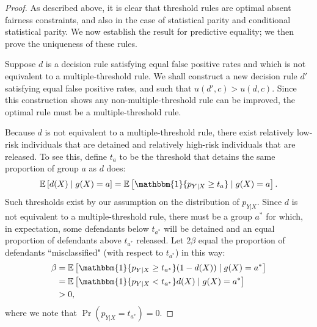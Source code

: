 \documentclass[sigconf]{acmart}
\newcommand{\EE}{\mathbb{E}}
\begin{document}
\begin{proof}

As described above, it is clear that threshold rules are optimal absent fairness constraints, and also in the case of statistical parity and conditional statistical parity.
We now establish the result for predictive equality; we then prove the uniqueness of these rules.

Suppose $d$ is a decision rule satisfying equal false positive rates
and which is not equivalent to a multiple-threshold rule.
We shall construct a new decision rule $d'$
satisfying equal false positive rates, and such that
$u(d',c) > u(d,c)$.
Since this construction shows any non-multiple-threshold rule can be improved, the optimal rule must be a multiple-threshold rule.

Because $d$ is not equivalent to a multiple-threshold rule, there exist relatively low-risk individuals that are detained and relatively high-risk 
individuals that are released.
To see this, define $t_a$ to be the threshold that detains the same proportion of group $a$ as $d$ does:
\begin{equation*}
\EE \left [d(X) \mid g(X)=a\right] = \EE \left [\mathbbm{1}\{p_{Y|X}\geq t_a\} \mid g(X)=a\right].
\end{equation*}
Such thresholds exist by our assumption on the distribution of $p_{Y|X}$.
Since $d$ is not equivalent to a multiple-threshold rule, there must be a group $a^*$ for which, in expectation, some defendants below $t_{a^*}$ will be detained and an equal proportion of defendants above $t_{a^*}$ released. Let $2\beta$ equal the proportion of defendants ``misclassified" (with respect to $t_{a^*}$) in this way:
\begin{align*}
\beta &= \EE \left[\mathbbm{1}\{p_{Y|X} \geq t_{a^*}\}(1-d(X)) \mid g(X)=a^*\right]\\
&= \EE \left[\mathbbm{1}\{p_{Y|X}< t_{a^*}\}d(X) \mid g(X)=a^*\right]\\
&>0,
\end{align*}
where we note that $\Pr( p_{Y|X} = t_{a^*}) = 0$.


\end{proof}
\end{document}
